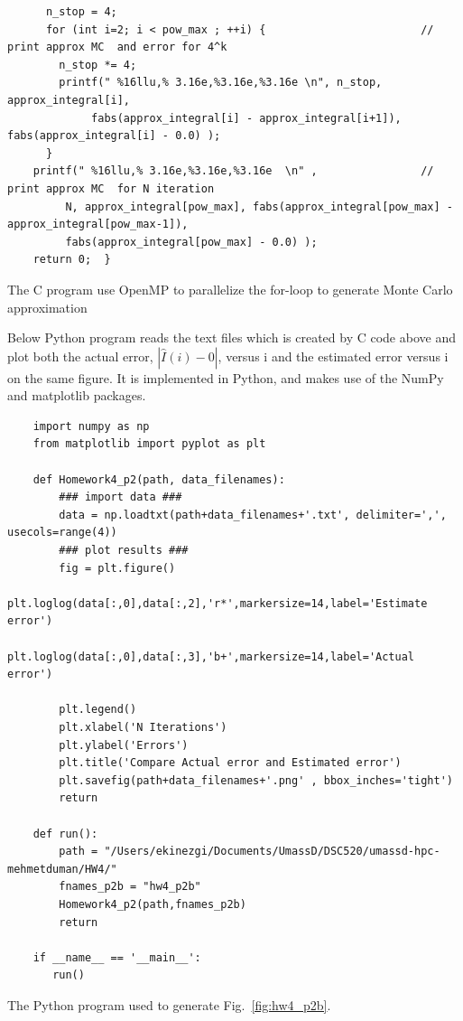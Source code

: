 \documentclass{article}
\begin{document}
\begin{program}
\begin{verbatim}
	  n_stop = 4;	
	  for (int i=2; i < pow_max ; ++i) {                        // print approx MC  and error for 4^k
	    n_stop *= 4;
	    printf(" %16llu,% 3.16e,%3.16e,%3.16e \n", n_stop, approx_integral[i], 
	         fabs(approx_integral[i] - approx_integral[i+1]), fabs(approx_integral[i] - 0.0) );
	  }
	printf(" %16llu,% 3.16e,%3.16e,%3.16e  \n" ,                // print approx MC  for N iteration
	     N, approx_integral[pow_max], fabs(approx_integral[pow_max] - approx_integral[pow_max-1]),
	     fabs(approx_integral[pow_max] - 0.0) );
	return 0;  }
		\end{verbatim}
	\caption{The C program use OpenMP to parallelize the for-loop to generate  Monte Carlo approximation}
	\label{fig:hw4_p1c}
\end{program}

\newpage

Below Python program reads the text files which is created by C code above and plot both the actual error,   $ | \hat{I}(i) - 0 | $, versus i and the estimated error versus i on the same figure. 
It is implemented in Python, and makes use of the NumPy and matplotlib packages.
\begin{program}
	\begin{verbatim}
	import numpy as np
	from matplotlib import pyplot as plt
	
	def Homework4_p2(path, data_filenames):
	   	### import data ###
	   	data = np.loadtxt(path+data_filenames+'.txt', delimiter=',', usecols=range(4))
	   	### plot results ###
	   	fig = plt.figure()
	   	plt.loglog(data[:,0],data[:,2],'r*',markersize=14,label='Estimate error')
	   	plt.loglog(data[:,0],data[:,3],'b+',markersize=14,label='Actual error')
	   	
	   	plt.legend()
	   	plt.xlabel('N Iterations')
	   	plt.ylabel('Errors')
	   	plt.title('Compare Actual error and Estimated error')
	   	plt.savefig(path+data_filenames+'.png' , bbox_inches='tight')
	   	return
	   		
	def run():    
	   	path = "/Users/ekinezgi/Documents/UmassD/DSC520/umassd-hpc-mehmetduman/HW4/"
	   	fnames_p2b = "hw4_p2b"
	   	Homework4_p2(path,fnames_p2b) 
	   	return
	   		
	if __name__ == '__main__':
	   run()
	\end{verbatim}
	\caption{The Python program used to generate Fig.\ \ref{fig:hw4_p2b}.}
\end{program}
\end{document}
